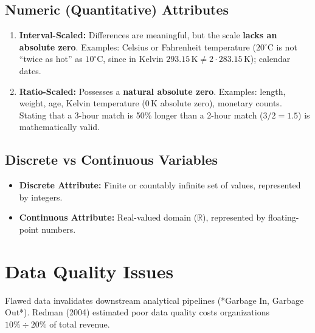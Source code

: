 \subsection{Numeric (Quantitative) Attributes}
\begin{enumerate}
    \item \textbf{Interval-Scaled:} Differences are meaningful, but the scale \textbf{lacks an absolute zero}. Examples: Celsius or Fahrenheit temperature ($20^\circ\text{C}$ is not ``twice as hot'' as $10^\circ\text{C}$, since in Kelvin $293.15\,\text{K} \neq 2 \cdot 283.15\,\text{K}$); calendar dates.
    \item \textbf{Ratio-Scaled:} Possesses a \textbf{natural absolute zero}. Examples: length, weight, age, Kelvin temperature ($0\,\text{K}$ absolute zero), monetary counts. Stating that a 3-hour match is 50\% longer than a 2-hour match ($3/2 = 1.5$) is mathematically valid.
\end{enumerate}

\subsection{Discrete vs Continuous Variables}
\begin{itemize}
    \item \textbf{Discrete Attribute:} Finite or countably infinite set of values, represented by integers.
    \item \textbf{Continuous Attribute:} Real-valued domain ($\mathbb{R}$), represented by floating-point numbers.
\end{itemize}

\FloatBarrier
\section{Data Quality Issues}

Flawed data invalidates downstream analytical pipelines (*Garbage In, Garbage Out*). Redman (2004) estimated poor data quality costs organizations $10\%\div 20\%$ of total revenue.


